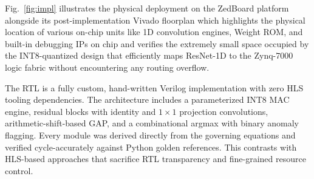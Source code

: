 \documentclass[conference]{IEEEtran}
\begin{document}
Fig.~\ref{fig:impl} illustrates the physical deployment on the ZedBoard platform alongside its post-implementation Vivado floorplan which highlights the physical location of various on-chip units like 1D convolution engines, Weight ROM, and built-in debugging IPs on chip and verifies the extremely small space occupied by the INT8-quantized design that efficiently maps ResNet-1D to the Zynq-7000 logic fabric without encountering any routing overflow.

The RTL is a fully custom, hand-written Verilog implementation with zero HLS tooling dependencies. The architecture includes a parameterized INT8 MAC engine, residual blocks with identity and $1\times1$ projection convolutions, arithmetic-shift-based GAP, and a combinational argmax with binary anomaly flagging. Every module was derived directly from the governing equations and verified cycle-accurately against Python golden references. This contrasts with HLS-based approaches that sacrifice RTL transparency and fine-grained resource control.
\end{document}
